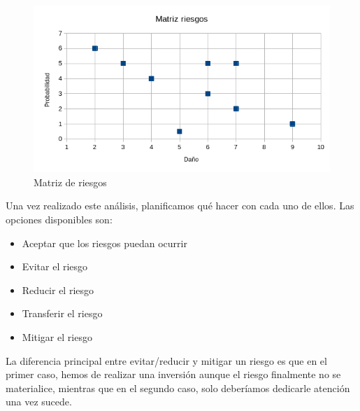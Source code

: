 \documentclass[12pt]{report} %
\begin{document}
\begin{figure}
    \centering
    \includegraphics[width=\textwidth]{risk-matrix.png}
    \caption{Matriz de riesgos}
    \label{fig:risk-matrix}
\end{figure}

Una vez realizado este análisis, planificamos qué hacer con cada uno de ellos. Las opciones disponibles son:

\begin{itemize}
    \item Aceptar que los riesgos puedan ocurrir
    \item Evitar el riesgo
    \item Reducir el riesgo
    \item Transferir el riesgo
    \item Mitigar el riesgo
\end{itemize}

La diferencia principal entre evitar/reducir y mitigar un riesgo es que en el primer caso, hemos de realizar una inversión aunque el riesgo finalmente no se materialice, mientras que en el segundo caso, solo deberíamos dedicarle atención una vez sucede.
\end{document}
